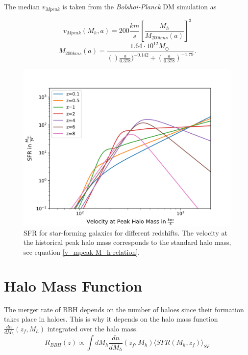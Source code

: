 The median $v_{Mpeak}$ is taken from the \textit{Bolshoi-Planck} DM simulation as

\begin{equation}
    v_{Mpeak}(M_h, a) = 200 \frac{km}{s}\left[ \frac{M_h}{M_{200kms}(a)}\right]^3
    \label{v_mpeak-M_h-relation}
\end{equation}
\begin{equation}
    M_{200kms}(a) = \frac{1.64 \cdot 10^{12} M_\odot\ }{()\frac{a}{0.378})^{-0.142}+(\frac{a}{0.378})^{-1.79}} .
\end{equation}


\begin{figure}[h]
    \centering
    \includegraphics[width=1\linewidth]{Images/sfr_of_v.png}
    \caption{SFR for star-forming galaxies for different redshifts. The velocity at the historical peak halo mass corresponds to the standard halo mass, see equation \ref{v_mpeak-M_h-relation}.}
    \label{SFR_of_v}
\end{figure} 

\section{Halo Mass Function}

The merger rate of BBH depends on the number of haloes since their formation takes place in haloes. This is why it depends on the halo mass function $\frac{dn}{dM_h}(z_f, M_h)$ integrated over the halo mass. 
\begin{equation}
    R_{BBH}(z) \propto \int dM_h \frac{dn}{dM_h}(z_f, M_h)\langle SFR(M_h, z_f)\rangle_{SF}
\end{equation}

